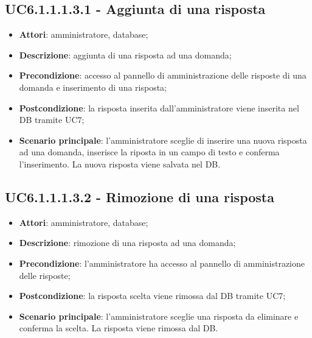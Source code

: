\documentclass[../AnalisiDeiRequisiti.tex]{subfiles}
\begin{document}
\subsection{UC6.1.1.1.3.1 - Aggiunta di una risposta} 
\label{sssec:UC6.1.1.1.3.1} 
\begin{itemize} 
\item \textbf{Attori}: amministratore, database;
\item \textbf{Descrizione}: aggiunta di una risposta ad una domanda;
\item \textbf{Precondizione}: accesso al pannello di amministrazione delle risposte di una domanda e inserimento di una risposta;
\item \textbf{Postcondizione}: la risposta inserita dall'amministratore viene inserita nel DB tramite UC7;
\item \textbf{Scenario principale}: l'amministratore sceglie di inserire una nuova risposta ad una domanda, inserisce la riposta in un campo di testo e conferma l'inserimento. La nuova risposta viene salvata nel DB.\end{itemize} 
\subsection{UC6.1.1.1.3.2 - Rimozione di una risposta} 
\label{sssec:UC6.1.1.1.3.2} 
\begin{itemize} 
\item \textbf{Attori}: amministratore, database;
\item \textbf{Descrizione}: rimozione di una risposta ad una domanda;
\item \textbf{Precondizione}: l'amministratore ha accesso al pannello di amministrazione delle risposte;
\item \textbf{Postcondizione}: la risposta scelta viene rimossa dal DB tramite UC7;
\item \textbf{Scenario principale}: l'amministratore sceglie una risposta da eliminare e conferma la scelta. La risposta viene rimossa dal DB.\end{itemize}
\newpage
\end{document}
